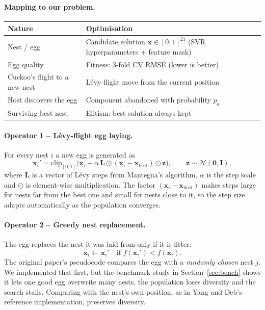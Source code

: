 \documentclass[12pt,a4paper]{article}
\numberwithin{equation}{section}
\numberwithin{table}{section}
\numberwithin{figure}{section}
\begin{document}
\paragraph{Mapping to our problem.}
\begin{center}
\renewcommand{\arraystretch}{1.2}
\begin{tabularx}{\textwidth}{@{}l>{\raggedright\arraybackslash}X@{}}
\toprule
\textbf{Nature} & \textbf{Optimisation} \\ \midrule
Nest / egg & Candidate solution $\mathbf{x} \in [0,1]^{21}$ (SVR hyperparameters + feature mask) \\
Egg quality & Fitness: 3-fold CV RMSE (lower is better) \\
Cuckoo's flight to a new nest & Lévy-flight move from the current position \\
Host discovers the egg & Component abandoned with probability $p_a$ \\
Surviving best nest & Elitism: best solution always kept \\ \bottomrule
\end{tabularx}
\end{center}

\paragraph{Operator 1 -- Lévy-flight egg laying.} For every nest $i$ a new egg is generated as
\begin{equation}
  \mathbf{x}_i' = \mathrm{clip}_{[0,1]}\Big( \mathbf{x}_i + \alpha \, \mathbf{L} \odot (\mathbf{x}_i - \mathbf{x}_{\text{best}}) \odot \mathbf{z} \Big), \qquad \mathbf{z} \sim \mathcal{N}(\mathbf{0}, \mathbf{I}),
  \label{eq:levy}
\end{equation}
where $\mathbf{L}$ is a vector of Lévy steps from Mantegna's algorithm, $\alpha$ is the step scale and $\odot$ is element-wise multiplication. The factor $(\mathbf{x}_i - \mathbf{x}_{\text{best}})$ makes steps large for nests far from the best one and small for nests close to it, so the step size adapts automatically as the population converges.

\paragraph{Operator 2 -- Greedy nest replacement.} The egg replaces the nest it was laid from only if it is fitter:
\begin{equation}
  \mathbf{x}_i \leftarrow \mathbf{x}_i' \quad \text{if } f(\mathbf{x}_i') < f(\mathbf{x}_i).
\end{equation}
The original paper's pseudocode compares the egg with a \emph{randomly chosen} nest $j$. We implemented that first, but the benchmark study in Section~\ref{sec:bench} shows it lets one good egg overwrite many nests, the population loses diversity and the search stalls. Comparing with the nest's own position, as in Yang and Deb's reference implementation, preserves diversity.
\end{document}
